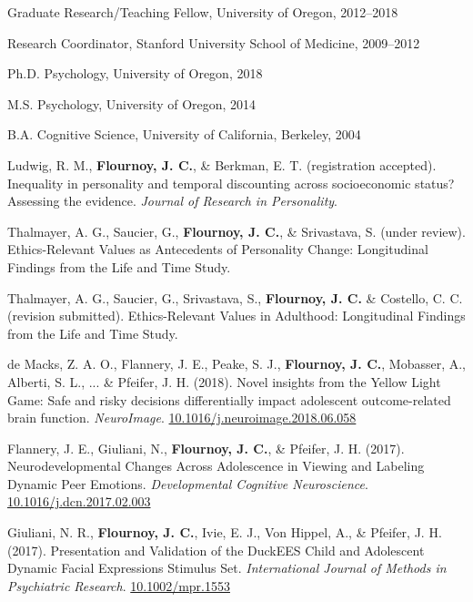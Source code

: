 \documentclass[11pt,article,oneside]{memoir}
\begin{document}
\ind Graduate Research/Teaching Fellow, University of Oregon, 2012--2018

\ind Research Coordinator, Stanford University School of Medicine, 2009--2012

\bigskip



\ind Ph.D. Psychology, University of Oregon, 2018

\ind M.S. Psychology, University of Oregon, 2014

\ind B.A. Cognitive Science, University of California, Berkeley, 2004

\bigskip
 
\medskip
\renewcommand{\thefootnote}{\fnsymbol{footnote}}
\ind Ludwig, R. M., \textbf{Flournoy, J. C.}, \& Berkman, E. T. (registration accepted). Inequality in personality and temporal discounting across socioeconomic status? Assessing the evidence. \textit{Journal of Research in Personality}.

\ind Thalmayer, A. G., Saucier, G., \textbf{Flournoy, J. C.},  \&  Srivastava, S. (under review). Ethics-Relevant Values as Antecedents of Personality Change:
Longitudinal Findings from the Life and Time Study.

\ind Thalmayer, A. G., Saucier, G., Srivastava, S.,  \textbf{Flournoy, J. C.} \& Costello, C. C. (revision submitted). Ethics-Relevant Values in Adulthood: Longitudinal Findings from the Life and Time Study.

\ind de Macks, Z. A. O., Flannery, J. E., Peake, S. J., \textbf{Flournoy, J. C.}, Mobasser, A., Alberti, S. L., ... \& Pfeifer, J. H. (2018). Novel insights from the Yellow Light Game: Safe and risky decisions differentially impact adolescent outcome-related brain function. \textit{NeuroImage}. \href{https://doi.org/10.1016/j.neuroimage.2018.06.058}{10.1016/j.neuroimage.2018.06.058}

\ind Flannery, J. E., Giuliani, N., \textbf{Flournoy, J. C.}, \& Pfeifer, J. H. (2017). Neurodevelopmental Changes Across Adolescence in Viewing and Labeling Dynamic Peer Emotions. \textit{Developmental Cognitive Neuroscience}. \newline\href{http://dx.doi.org/10.1016/j.dcn.2017.02.003}{10.1016/j.dcn.2017.02.003}

\ind Giuliani, N. R., \textbf{Flournoy, J. C.}, Ivie, E. J., Von Hippel, A., \& Pfeifer, J. H. (2017). Presentation and Validation of the DuckEES Child and Adolescent Dynamic Facial Expressions Stimulus Set. \textit{International Journal of Methods in Psychiatric Research}. \href{https://doi.org/10.1002/mpr.1553}{10.1002/mpr.1553}
\end{document}
